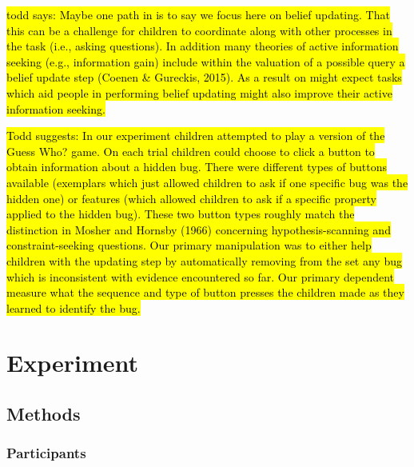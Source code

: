 \documentclass[10pt,letterpaper]{article}
\begin{document}
\hl{todd says: Maybe one path in is to say we focus here on belief updating.  That this
can be a challenge for children to coordinate along with other processes in
the task (i.e., asking questions).  In addition many theories of active
information seeking (e.g., information gain) include within the valuation of a
possible query a belief update step (Coenen \& Gureckis, 2015).  As a result
on might expect tasks which aid people in performing belief updating might
also improve their active information seeking.}

\hl{Todd suggests: In our experiment children attempted to play a version of the Guess
Who? game.  On each trial children could choose to click a button to obtain
information about a hidden bug.  There were different types of buttons
available (exemplars which just allowed children to ask if one specific bug
was the hidden one) or features (which allowed children to ask if a specific
property applied to the hidden bug).  These two button types roughly match
the distinction in Mosher and Hornsby (1966) concerning hypothesis-scanning
and constraint-seeking questions.  Our primary manipulation was
to either help children with the updating step by automatically removing
from the set any bug which is inconsistent with evidence encountered so far.
Our primary dependent measure what the sequence and type of button
presses the children made as they learned to identify the bug.}

\section{Experiment}


\subsection{Methods}

\subsubsection{Participants}
\end{document}
